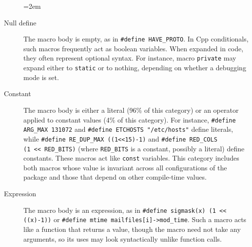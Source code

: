 \documentclass[10pt]{article}
\begin{document}
\begin{description}
  \sloppy
  \emergencystretch=2em


\item[Null define]  The macro body is empty, as in {\tt \#define
  \verb|HAVE_PROTO|}\@.  In Cpp conditionals, such macros frequently act as
boolean variables.  When expanded in code, they often represent
optional syntax.  For instance, macro {\tt private} may expand either to
{\tt static} or to nothing, depending on whether a debugging mode is set.

\item[Constant] The macro body is either a literal (96\% of this category)
  or an operator applied to constant values (4\% of this category).  For
  instance, {\tt \#define \verb|ARG_MAX| 131072} and {\tt \#define
  ETCHOSTS "/etc/hosts"} define literals, while {\tt \#define
\verb|RE_DUP_MAX| ((1<<15)-1)} and {\tt \#define \verb|RED_COLS| (1~<<~\verb|RED_BITS|)} (where \verb|RED_BITS| is a constant, possibly a literal)
define constants.  These macros act like {\tt const} variables.  This
category includes both macros whose value is invariant across all
configurations of the package and those that depend on other compile-time
values.


\item[Expression]  The macro body is an expression, as in {\tt \#define
  sigmask(x) (1 << ((x)-1))} or {\tt \#define mtime mailfiles[i]->\verb|mod_time|}.
Such a macro acts like a function that returns a value, though the
macro need not take any arguments, so its uses may look syntactically
unlike function calls. 



\end{description}
\end{document}
